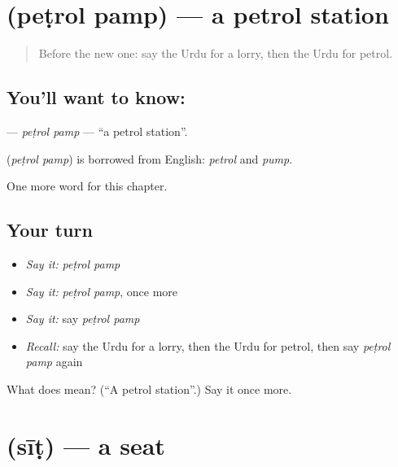 \section[\texorpdfstring{\ur{پیٹرول} \ur{پمپ} (peṭrol pamp)}{پیٹرول پمپ (peṭrol pamp)}]{  (peṭrol pamp) — a petrol station}

\label{lesson:UR-C229-petrol-pamp}



\begin{quote}
Before the new one: say the Urdu for a lorry, then the Urdu for petrol.
\end{quote}

\subsection*{You'll want to know:  }
\textbf{ } — \emph{peṭrol pamp} — \textquotedblleft{}a petrol station\textquotedblright{}.

\begin{cousinweb}
\textbf{ } (\emph{peṭrol pamp}) is borrowed from English: \emph{petrol} and \emph{pump}.
\end{cousinweb}

\begin{grammarlens}[title={What you've built}]
One more word for this chapter.
\end{grammarlens}

\subsection*{Your turn}
\begin{itemize}
\raggedright
  \item \emph{Say it:} \emph{peṭrol pamp}
  \item \emph{Say it:} \emph{peṭrol pamp}, once more
  \item \emph{Say it:} say \emph{peṭrol pamp}
  \item \emph{Recall:} say the Urdu for a lorry, then the Urdu for petrol, then say \emph{peṭrol pamp} again
\end{itemize}

\begin{tcolorbox}[breakable,colback=teal!4,colframe=teal!35!black,title={Before you move on}]
What does   mean? (\textquotedblleft{}A petrol station\textquotedblright{}.) Say it once more.
\end{tcolorbox}
\section[\texorpdfstring{\ur{سیٹ} (sīṭ)}{سیٹ (sīṭ)}]{ (sīṭ) — a seat}

